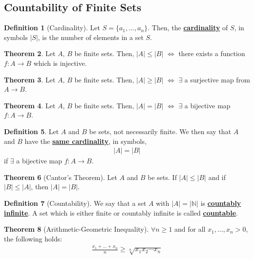 \documentclass[reqno,11pt]{amsart}
\theoremstyle{definition}
\newtheorem{theorem}{Theorem}
\theoremstyle{definition}
\newtheorem{definition}[theorem]{Definition}
\theoremstyle{remark}
\newcommand{\dfn}[1]{\underline{\textbf{#1}}}
\begin{document}
\subsection{Countability of Finite Sets}
\begin{definition}[Cardinality]
	Let $S = \{ a_1, ..., a_n \}$. Then, the \dfn{cardinality} of $S$, in symbols $|S|$, is the number of elements in a set $S$. 
\end{definition}

\begin{theorem}
	Let $A$, $B$ be finite sets. Then, $|A| \leq |B|$ $\iff$ there exists a function $f: A \rightarrow B$ which is injective.
\end{theorem}

\begin{theorem}
	Let $A$, $B$ be finite sets. Then, $|A| \geq |B|$ $\iff$ $\exists$ a surjective map from $A \rightarrow B$.
\end{theorem}

\begin{theorem}
	Let $A$, $B$ be finite sets. Then, $|A| = |B| $ $\iff$ $\exists$ a bijective map $f: A \rightarrow B$.
\end{theorem}

\begin{definition}
	Let $A$ and $B$ be sets, not necessarily finite. We then say that $A$ and $B$ have the \dfn{same cardinality}, in symbols, 
	\begin{align}
		|A| = |B|	
	\end{align}
	if $\exists$ a bijective map $f: A \rightarrow B$. 
\end{definition}

\begin{theorem}[Cantor's Theorem]
	Let $A$ and $B$ be sets. If $|A| \leq |B|$ and if $|B| \leq |A|$, then $|A| = |B|$. 
\end{theorem}

\begin{definition}[Countability]
	We say that a set $A$ with $|A| = | \mathbb{N} |$ is \dfn{countably infinite}. A set which is either finite or countably infinite is called \dfn{countable}.
\end{definition}

\begin{theorem}[Arithmetic-Geometric Inequality]
	$\forall n \geq 1$ and for all $x_1, ..., x_n >0$, the following holds: 
\begin{align}
	\frac{x_1 + ... + x_n}{n} \geq \sqrt[n]{x_1x_2 \cdots x_n }	
\end{align}
\end{theorem}
\end{document}
